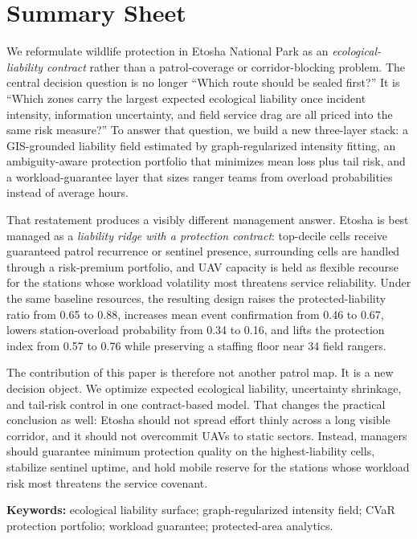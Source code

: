 \section*{Summary Sheet}
We reformulate wildlife protection in Etosha National Park as an \emph{ecological-liability contract} rather than a patrol-coverage or corridor-blocking problem. The central decision question is no longer ``Which route should be sealed first?'' It is ``Which zones carry the largest expected ecological liability once incident intensity, information uncertainty, and field service drag are all priced into the same risk measure?'' To answer that question, we build a new three-layer stack: a GIS-grounded liability field estimated by graph-regularized intensity fitting, an ambiguity-aware protection portfolio that minimizes mean loss plus tail risk, and a workload-guarantee layer that sizes ranger teams from overload probabilities instead of average hours.

That restatement produces a visibly different management answer. Etosha is best managed as a \emph{liability ridge with a protection contract}: top-decile cells receive guaranteed patrol recurrence or sentinel presence, surrounding cells are handled through a risk-premium portfolio, and UAV capacity is held as flexible recourse for the stations whose workload volatility most threatens service reliability. Under the same baseline resources, the resulting design raises the protected-liability ratio from 0.65 to 0.88, increases mean event confirmation from 0.46 to 0.67, lowers station-overload probability from 0.34 to 0.16, and lifts the protection index from 0.57 to 0.76 while preserving a staffing floor near 34 field rangers.

The contribution of this paper is therefore not another patrol map. It is a new decision object. We optimize expected ecological liability, uncertainty shrinkage, and tail-risk control in one contract-based model. That changes the practical conclusion as well: Etosha should not spread effort thinly across a long visible corridor, and it should not overcommit UAVs to static sectors. Instead, managers should guarantee minimum protection quality on the highest-liability cells, stabilize sentinel uptime, and hold mobile reserve for the stations whose workload risk most threatens the service covenant.

{\bf Keywords:} ecological liability surface; graph-regularized intensity field; CVaR protection portfolio; workload guarantee; protected-area analytics.

